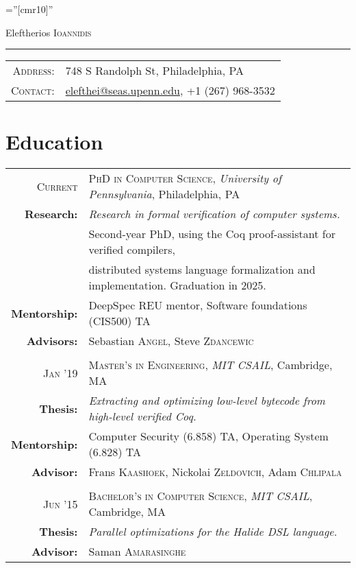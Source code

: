 \documentclass[lettersize,11pt]{article}
\begin{document}
\pagestyle{empty} %
\font\fb=''[cmr10]'' %

\par{\centering
		{\Huge Eleftherios \textsc{Ioannidis}
	}
	\bigskip\par}

\hrule
\begin{tabular}{rl}
    \textsc{Address:}   & 748 S Randolph St, Philadelphia, PA \\
    \textsc{Contact:}   & \href{mailto:elefthei@seas.upenn.edu}{elefthei@seas.upenn.edu}, +1 (267) 968-3532 \\
\end{tabular}

\section{Education}
\begin{tabular}{rl}
\textsc{Current} & \textsc{PhD in Computer Science}, \emph{University of Pennsylvania}, Philadelphia, PA\\
\textbf{Research:} & \emph{Research in formal verification of computer systems.}\\
& Second-year PhD, using the Coq proof-assistant for verified compilers, \\
& distributed systems language formalization and implementation. Graduation in 2025. \\
\textbf{Mentorship:} & DeepSpec REU mentor, Software foundations (CIS500) TA \\
\textbf{Advisors:} & Sebastian \textsc{Angel}, Steve \textsc{Zdancewic}\\
 & \\[-0.5em]
\textsc{Jan} '19 & \textsc{Master's in Engineering}, \emph{MIT} \emph{CSAIL}, Cambridge, MA\\
\textbf{Thesis:} & \emph{Extracting and optimizing low-level bytecode from high-level verified Coq.}\\
\textbf{Mentorship:} & Computer Security (6.858) TA, Operating System (6.828) TA \\
\textbf{Advisor:} & Frans \textsc{Kaashoek}, Nickolai \textsc{Zeldovich}, Adam \textsc{Chlipala}\\
 & \\[-0.5em]
\textsc{Jun} '15 & \textsc{Bachelor's in Computer Science}, \emph{MIT} \emph{CSAIL}, Cambridge, MA\\
\textbf{Thesis:} & \emph{Parallel optimizations for the Halide DSL language.}\\
\textbf{Advisor:} & Saman \textsc{Amarasinghe}\\
\end{tabular}
\end{document}
